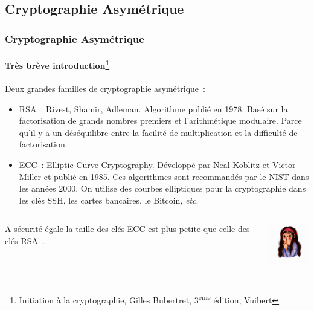 \documentclass{beamer}
\begin{document}
    \subsection{Cryptographie Asymétrique}\label{subsec:cryptographie-asymetrique}
    \begin{frame}
        \frametitle{Cryptographie Asymétrique}
        \framesubtitle{Très brève introduction\footnote{Initiation à la cryptographie, Gilles Bubertret, 3\textsuperscript{eme} édition, Vuibert}}
        \transdissolve
        Deux grandes familles de cryptographie asymétrique~:
        \begin{itemize}
            \item RSA~: Rivest, Shamir, Adleman.
            Algorithme publié en 1978.
            Basé sur la factorisation de grands nombres premiers et l'arithmétique modulaire.
            Parce qu'il y a un déséquilibre entre la facilité de multiplication et la difficulté de factorisation.
            \item ECC~: Elliptic Curve Cryptography.
            Développé par Neal Koblitz et Victor Miller et publié en 1985.
            Ces algorithmes sont recommandés par le NIST dans les années 2000.
            On utilise des courbes elliptiques pour la cryptographie dans les clés SSH, les cartes bancaires, le Bitcoin, \textit{etc}.
        \end{itemize}
        \begin{columns}
            \begin{column}{0.8\textwidth}
                A sécurité égale la taille des clés ECC est plus petite que celle des clés RSA~.
            \end{column}
            \begin{column}{0.2\textwidth}
                \centering
                \includegraphics[width=2cm]{image/girl-hiding-a-secret}
            \end{column}
        \end{columns}
    \end{frame}
\end{document}
